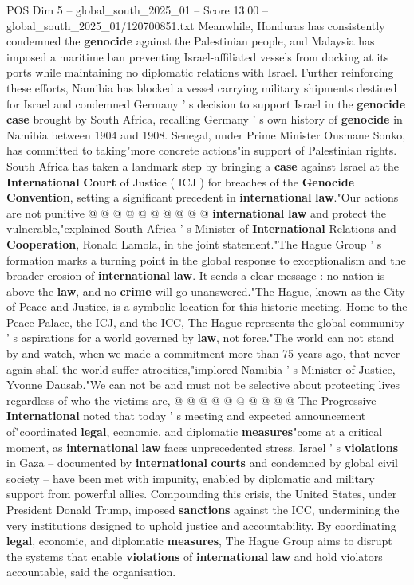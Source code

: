 \begin{textsample}{POS Dim 5 – global\_south\_2025\_01 – Score 13.00 – global\_south\_2025\_01/120700851.txt}
Meanwhile, Honduras has consistently condemned the \textbf{genocide} against the Palestinian people, and Malaysia has imposed a maritime ban preventing Israel-affiliated vessels from docking at its ports while maintaining no diplomatic relations with Israel.
Further reinforcing these efforts, Namibia has blocked a vessel carrying military shipments destined for Israel and condemned Germany ' s decision to support Israel in the \textbf{genocide} \textbf{case} brought by South Africa, recalling Germany ' s own history of \textbf{genocide} in Namibia between 1904 and 1908.
Senegal, under Prime Minister Ousmane Sonko, has committed to taking"more concrete actions"in support of Palestinian rights.
South Africa has taken a landmark step by bringing a \textbf{case} against Israel at the \textbf{International} \textbf{Court} of Justice ( ICJ ) for breaches of the \textbf{Genocide} \textbf{Convention}, setting a significant precedent in \textbf{international} \textbf{law}."Our actions are not punitive @ @ @ @ @ @ @ @ @ @ \textbf{international} \textbf{law} and protect the vulnerable,"explained South Africa ' s Minister of \textbf{International} Relations and \textbf{Cooperation}, Ronald Lamola, in the joint statement."The Hague Group ' s formation marks a turning point in the global response to exceptionalism and the broader erosion of \textbf{international} \textbf{law}.
It sends a clear message : no nation is above the \textbf{law}, and no \textbf{crime} will go unanswered."The Hague, known as the City of Peace and Justice, is a symbolic location for this historic meeting.
Home to the Peace Palace, the ICJ, and the ICC, The Hague represents the global community ' s aspirations for a world governed by \textbf{law}, not force."The world can not stand by and watch, when we made a commitment more than 75 years ago, that never again shall the world suffer atrocities,"implored Namibia ' s Minister of Justice, Yvonne Dausab."We can not be and must not be selective about protecting lives regardless of who the victims are, @ @ @ @ @ @ @ @ @ @ The Progressive \textbf{International} noted that today ' s meeting and expected announcement of"coordinated \textbf{legal}, economic, and diplomatic \textbf{measures}"come at a critical moment, as \textbf{international} \textbf{law} faces unprecedented stress.
Israel ' s \textbf{violations} in Gaza -- documented by \textbf{international} \textbf{courts} and condemned by global civil society -- have been met with impunity, enabled by diplomatic and military support from powerful allies.
Compounding this crisis, the United States, under President Donald Trump, imposed \textbf{sanctions} against the ICC, undermining the very institutions designed to uphold justice and accountability.
By coordinating \textbf{legal}, economic, and diplomatic \textbf{measures}, The Hague Group aims to disrupt the systems that enable \textbf{violations} of \textbf{international} \textbf{law} and hold violators accountable, said the organisation.

\end{textsample}
